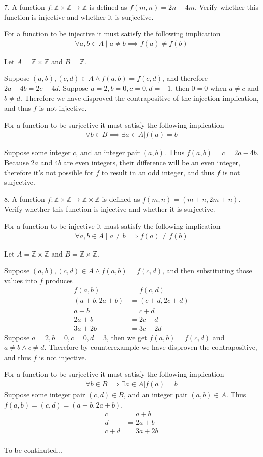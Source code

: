 \documentclass{idrisMemo}
\newcommand{\inj}{
\item For a function to be injective it must satisfy the following implication
\begin{align*}
    \forall a,b \in A\mid a\neq b\implies f(a)\neq f(b)
\end{align*}
}
\newcommand{\surj}{
\item For a function to be surjective it must satisfy the following implication
\begin{align*}
    \forall b \in B \implies \exists a \in A | f(a) = b
\end{align*}
}
\begin{document}
\begin{prooflist}{7. A function $f: \mathbb{Z} \times \mathbb{Z} \rightarrow
    \mathbb{Z}$ is defined as $f(m, n)=2 n-4 m$. Verify whether this function is
injective and whether it is surjective.}
\inj{}
\item Let $A=\mathbb{Z}\times\mathbb{Z}$ and $B=\mathbb{Z}$.
\item Suppose $(a, b), (c, d) \in A \land f(a, b)=f(c, d)$, and therefore
    $2a-4b=2c-4d$. Suppose $a=2, b=0, c=0, d=-1$, then $0=0$ when $a\neq c$
    and $b\neq d$. Therefore we have disproved the contrapositive of the
    injection implication, and thus $f$ is not injective.
\surj{}
\item Suppose some integer $c$, and an integer pair $(a, b)$. Thus $f(a,
    b)=c=2a-4b$. Because $2a$ and $4b$ are even integers, their difference will
    be an even integer, therefore it's not possible for $f$ to result in an odd
    integer, and thus $f$ is not surjective.
\end{prooflist}

\begin{prooflist}{8. A function $f: \mathbb{Z} \times \mathbb{Z} \rightarrow
        \mathbb{Z} \times \mathbb{Z}$ is defined as \mbox{$f(m, n)=(m+n, 2 m+n)$}. Verify
whether this function is injective and whether it is surjective.}
\inj{}
\item Let $A=\mathbb{Z}\times\mathbb{Z}$ and $B=\mathbb{Z}\times\mathbb{Z}$.
\item Suppose $(a, b), (c, d) \in A \land f(a, b)=f(c, d)$, and then
    substituting those values into $f$ produces
\begin{align*}
    f(a, b)&=f(c, d)\\
    (a+b, 2a+b)&=(c+d, 2c+d)\\
    a+b&=c+d \\
    2a+b&=2c+d \\
    3a+2b &= 3c+2d
\end{align*}
Suppose $a=2, b=0, c=0, d=3$, then we get $f(a, b)=f(c, d)$ and $a\neq b \land
c\neq d$. Therefore by counterexample we have disproven the contrapositive, and
thus $f$ is not injective.
\surj{}
Suppose some integer pair $(c, d)\in B$, and an integer pair $(a, b)\in
    A$. Thus $f(a, b)=(c, d)=(a+b, 2a+b)$.
\begin{align*}
    c&=a+b\\
    d&=2a+b \\
    c+d&=3a+2b \\
\end{align*}
\item To be continuted$\dots$
\end{prooflist}
\end{document}
